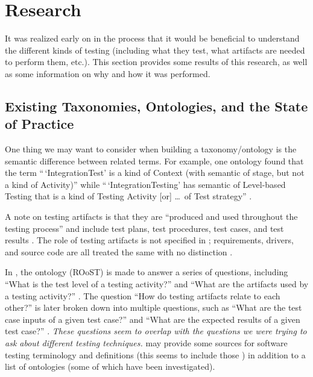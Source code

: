 \chapter{Research}
\label{research}

It was realized early on in the process that it would be beneficial to
understand the different kinds of testing (including what they test, what
artifacts are needed to perform them, etc.). This section provides some results
of this research, as well as some information on why and how it was performed.

\section{Existing Taxonomies, Ontologies, and the State of Practice}
\label{exist-tax}

One thing we may want to consider when building a taxonomy/ontology is the
semantic difference between related terms. For example, one ontology found
that the term ``\,`IntegrationTest' is a kind of Context (with
semantic of stage, but not a kind of Activity)'' while ``\,`IntegrationTesting'
has semantic of Level-based Testing that is a kind of Testing Activity [or]
\dots\ of Test strategy'' \citep[p.~157]{TebesEtAl2019}.

A note on testing artifacts is that they are ``produced and used throughout
the testing process'' and include test plans, test procedures, test cases, and
test results \citep[p.~3]{SouzaEtAl2017}. The role of testing
artifacts is not specified in \citep{BarbosaEtAl2006};
requirements, drivers, and source code are all treated the same
with no distinction \citep[p.~3]{BarbosaEtAl2006}.

In \citep{SouzaEtAl2017}, the ontology (ROoST)  is made to
answer a series of questions, including ``What is the test level of a testing
activity?'' and ``What are the artifacts used by a testing activity?''
\citep[pp.~8-9]{SouzaEtAl2017}.
The question ``How do testing artifacts relate to each other?''
\citep[p.~8]{SouzaEtAl2017} is later broken down into multiple questions,
such as ``What are the test case inputs of a given test case?'' and ``What are
the expected results of a given test case?'' \citep[p.~21]{SouzaEtAl2017}.
\emph{These questions seem to overlap with the questions we were trying to ask
    about different testing techniques.} \citet[pp.~152-153]{TebesEtAl2019} may
provide some sources for software testing terminology and definitions
(this seems to include those \suggSrcs{}) in addition to a list of ontologies
(some of which have been investigated).

